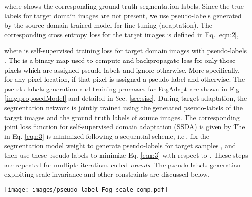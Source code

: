 \documentclass[final,5p,times,twocolumn]{elsarticle}
\begin{document}
where  shows the corresponding ground-truth segmentation labels.
Since the true labels for target domain images are not present, we use pseudo-labels generated by the source domain trained model for fine-tuning (adaptation).
The corresponding cross entropy loss for the target images is defined in Eq. \ref{eqn:2},

where   is self-supervised training loss for target domain images with pseudo-labels . 
\textcolor{black}{The  is a binary map used to compute and backpropagate loss for only those pixels which are assigned pseudo-labels and ignore otherwise. More specifically, for any pixel location,  if that pixel is assigned a pseudo-label and  otherwise. }
The pseudo-labels generation and training processes for FogAdapt are shown in Fig. \ref{img:proposedModel} and detailed in Sec. \ref{sec:sisc}. 
During target adaptation, the segmentation network is jointly trained using the generated pseudo-labels of the target images and the ground truth labels of source images. 
The corresponding joint loss function for self-supervised domain adaptation (SSDA) is given by 
The  in Eq. \ref{eqn:3} is minimized following a sequential scheme, i.e., fix the segmentation model weight  to generate pseudo-labels  for target samples , and then use these pseudo-labels to minimize Eq. \ref{eqn:3} with respect to .
These steps are repeated for multiple iterations called \textit{rounds}.
The pseudo-labels generation exploiting scale invariance and other constraints are discussed below. 







\begin{figure*}[!t]
	\centering
	\texttt{[image: images/pseudo-label\_Fog\_scale\_comp.pdf]}
\caption{
	The proposed FogAdapt framework. 
	(a) Scale-invariant pseudo-labels generation process where, 1) a target image is resized at multiple scales. 2) the resized versions of the image are segmented independently, 3) uncertainty (self-entropy) based weight maps for each image scale are defined and the outputs are weighted respectively 4) the weighted outputs are then resized to the original scale and recombined, and 5) most confident pixels are assigned pseudo-labels. (b) shows the semantic segmentation adaptation using the generated pseudo-labels for target domain images in (a) and the true labels of source domain images simultaneously.  \textcolor{black}{ are source image (after translation), source image labels, target image and target image pseudo-labels, respectively. }
	}
	
	\label{img:proposedModel}
\end{figure*}
\end{document}
